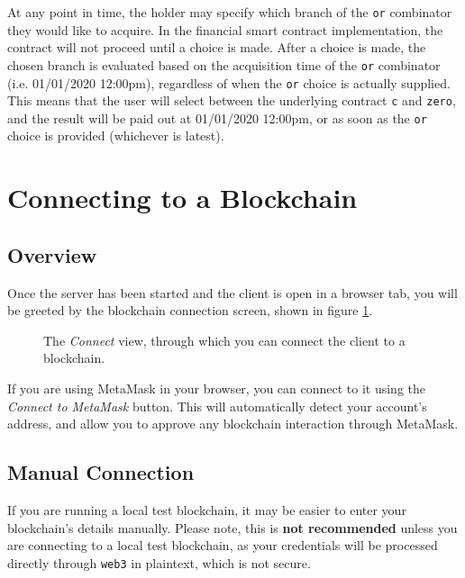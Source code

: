 At any point in time, the holder may specify which branch of the \texttt{or} combinator they would like to acquire. In the financial smart contract implementation, the contract will not proceed until a choice is made. After a choice is made, the chosen branch is evaluated based on the acquisition time of the \texttt{or} combinator (i.e. 01/01/2020 12:00pm), regardless of when the \texttt{or} choice is actually supplied. \\

This means that the user will select between the underlying contract \texttt{c} and \texttt{zero}, and the result will be paid out at 01/01/2020 12:00pm, or as soon as the \texttt{or} choice is provided (whichever is latest).


\section{Connecting to a Blockchain} \label{UG:connecting}

\subsection{Overview}

Once the server has been started and the client is open in a browser tab, you will be greeted by the blockchain connection screen, shown in figure \ref{UG:fig:connect}.

\begin{figure}[h]
    \centering
    \caption{The \textit{Connect} view, through which you can connect the client to a blockchain.}
    \label{UG:fig:connect}
\end{figure}

If you are using MetaMask in your browser, you can connect to it using the \textit{Connect to MetaMask} button. This will automatically detect your account's address, and allow you to approve any blockchain interaction through MetaMask.


\subsection{Manual Connection}

If you are running a local test blockchain, it may be easier to enter your blockchain's details manually. Please note, this is \textbf{not recommended} unless you are connecting to a local test blockchain, as your credentials will be processed directly through \texttt{web3} in plaintext, which is not secure. \\

